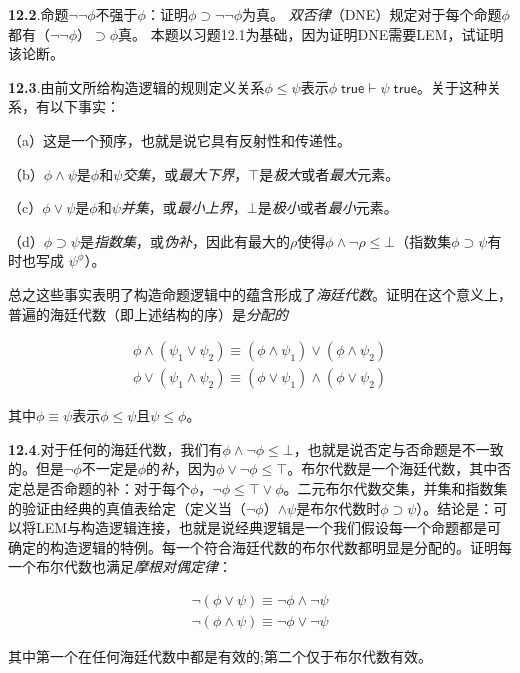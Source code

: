 \textbf{12.2}.命题${\lnot\lnot\phi}$不强于${\phi}$：证明${\phi\supset\lnot\lnot\phi}$为真。 \textit{双否律}（DNE）规定对于每个命题${\phi}$都有（${\lnot\lnot\phi}$）${\supset\phi}$真。 本题以习题12.1为基础，因为证明DNE需要LEM，试证明该论断。


\textbf{12.3}.由前文所给构造逻辑的规则定义关系${\phi\leq\psi}$表示$\phi\;\mathsf{true}  \vdash \psi\; \mathsf{true}$。关于这种关系，有以下事实：

（a）这是一个预序，也就是说它具有反射性和传递性。

（b）${\phi\land\psi}$是${\phi}$和${\psi}$\textit{交集}，或\textit{最大下界}，${\top}$是\textit{极大}或者\textit{最大}元素。%

（c）${\phi\lor\psi}$是${\phi}$和${\psi}$\textit{并集}，或\textit{最小上界}，${\bot}$是\textit{极小}或者\textit{最小}元素。

（d）${\phi\supset\psi}$是\textit{指数集}，或\textit{伪补}，因此有最大的${\rho}$使得${\phi \land \lnot\rho\leq\bot}$（指数集${\phi\supset\psi}$有时也写成 ${\psi^\phi}$）。

总之这些事实表明了构造命题逻辑中的蕴含形成了\textit{海廷代数}。证明在这个意义上，普遍的海廷代数（即上述结构的序）是\textit{分配的}

$$
\begin{array}{c}
    \phi\land(\psi_1\lor\psi_2)   \equiv (\phi\land\psi_1)\lor(\phi\land\psi_2)  \\
    \phi\lor(\psi_1\land\psi_2)   \equiv (\phi\lor\psi_1)\land(\phi\lor\psi_2)
\end{array}
$$

其中${\phi\equiv\psi}$表示${\phi\leq\psi}$且${\psi\leq\phi}$。


\textbf{12.4}.对于任何的海廷代数，我们有${\phi \land \lnot\phi\leq\bot}$，也就是说否定与否命题是不一致的。但是${\lnot\phi}$不一定是${\phi}$的\textit{补}，因为${\phi \lor \lnot\phi\leq\top}$。布尔代数是一个海廷代数，其中否定总是否命题的补：对于每个${\phi}$，${\lnot\phi\leq\top \lor \phi}$。二元布尔代数交集，并集和指数集的验证由经典的真值表给定（定义当（${\lnot\phi}$）${\land\psi}$是布尔代数时${\phi\supset\psi}$）。结论是：可以将LEM与构造逻辑连接，也就是说经典逻辑是一个我们假设每一个命题都是可确定的构造逻辑的特例。每一个符合海廷代数的布尔代数都明显是分配的。证明每一个布尔代数也满足\textit{摩根对偶定律}：

$$
\begin{array}{c}
    \lnot(\phi\lor\psi)   \equiv \lnot\phi\land\lnot\psi   \\
    \lnot(\phi\land\psi)   \equiv \lnot\phi\lor\lnot\psi
\end{array}
$$

其中第一个在任何海廷代数中都是有效的;第二个仅于布尔代数有效。

